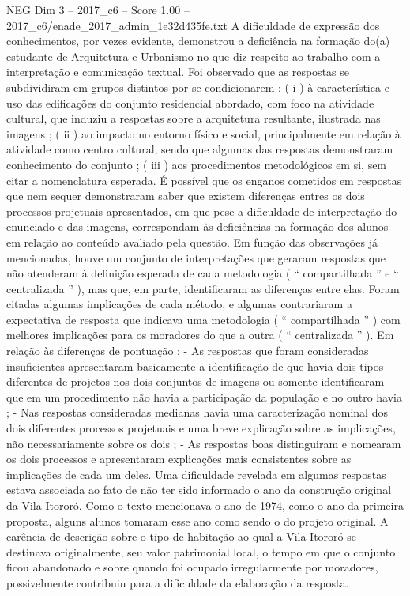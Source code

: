 \begin{textsample}{NEG Dim 3 – 2017\_c6 – Score 1.00 – 2017\_c6/enade\_2017\_admin\_1e32d435fe.txt}
A dificuldade de expressão dos conhecimentos, por vezes evidente, demonstrou a deficiência na formação do(a) estudante de Arquitetura e Urbanismo no que diz respeito ao trabalho com a interpretação e comunicação textual.
Foi observado que as respostas se subdividiram em grupos distintos por se condicionarem : ( i ) à característica e uso das edificações do conjunto residencial abordado, com foco na atividade cultural, que induziu a respostas sobre a arquitetura resultante, ilustrada nas imagens ; ( ii ) ao impacto no entorno físico e social, principalmente em relação à atividade como centro cultural, sendo que algumas das respostas demonstraram conhecimento do conjunto ; ( iii ) aos procedimentos metodológicos em si, sem citar a nomenclatura esperada.
É possível que os enganos cometidos em respostas que nem sequer demonstraram saber que existem diferenças entres os dois processos projetuais apresentados, em que pese a dificuldade de interpretação do enunciado e das imagens, correspondam às deficiências na formação dos alunos em relação ao conteúdo avaliado pela questão.
Em função das observações já mencionadas, houve um conjunto de interpretações que geraram respostas que não atenderam à definição esperada de cada metodologia ( “ compartilhada ” e “ centralizada ” ), mas que, em parte, identificaram as diferenças entre elas.
Foram citadas algumas implicações de cada método, e algumas contrariaram a expectativa de resposta que indicava uma metodologia ( “ compartilhada ” ) com melhores implicações para os moradores do que a outra ( “ centralizada ” ).
Em relação às diferenças de pontuação : - As respostas que foram consideradas insuficientes apresentaram basicamente a identificação de que havia dois tipos diferentes de projetos nos dois conjuntos de imagens ou somente identificaram que em um procedimento não havia a participação da população e no outro havia ; - Nas respostas consideradas medianas havia uma caracterização nominal dos dois diferentes processos projetuais e uma breve explicação sobre as implicações, não necessariamente sobre os dois ; - As respostas boas distinguiram e nomearam os dois processos e apresentaram explicações mais consistentes sobre as implicações de cada um deles.
Uma dificuldade revelada em algumas respostas estava associada ao fato de não ter sido informado o ano da construção original da Vila Itororó.
Como o texto mencionava o ano de 1974, como o ano da primeira proposta, alguns alunos tomaram esse ano como sendo o do projeto original.
A carência de descrição sobre o tipo de habitação ao qual a Vila Itororó se destinava originalmente, seu valor patrimonial local, o tempo em que o conjunto ficou abandonado e sobre quando foi ocupado irregularmente por moradores, possivelmente contribuiu para a dificuldade da elaboração da resposta.

\end{textsample}
